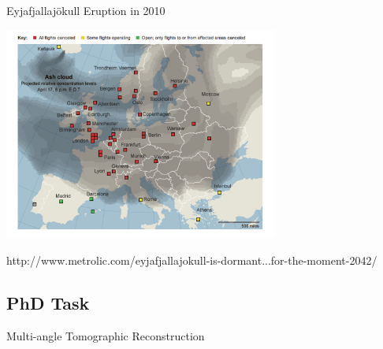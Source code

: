 \documentclass[compress,red,12pt]{beamer}
\begin{document}
\begin{frame}[label=current]{Eyjafjallaj\"{o}kull Eruption in 2010}
  \begin{center}
    \includegraphics[height=7cm]{images/volcano-airport.jpg}
  \end{center}
  \begin{flushright}
    {\tiny http://www.metrolic.com/eyjafjallajokull-is-dormant...for-the-moment-2042/}
  \end{flushright}
\end{frame}


\subsection{PhD Task}

\begin{frame}{Multi-angle Tomographic Reconstruction}
  \begin{center}
    {
      \centerline{\def\svgwidth{\linewidth}\small{}}
    }
    {
      \centerline{\def\svgwidth{\linewidth}\small{}}
    }
  \end{center}
\end{frame}

\end{document}

